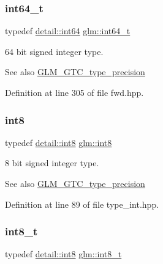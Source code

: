 \subsubsection{\texorpdfstring{int64\+\_\+t}{int64\_t}}
{\footnotesize\ttfamily typedef \hyperlink{namespaceglm_1_1detail_a5b1c3227ec636c24a0676746381adfc8}{detail\+::int64} \hyperlink{group__gtc__type__precision_ga6abb23fbf4e39c50ec5341160b5da5ab}{glm\+::int64\+\_\+t}}

64 bit signed integer type. \begin{DoxySeeAlso}{See also}
\hyperlink{group__gtc__type__precision}{G\+L\+M\+\_\+\+G\+T\+C\+\_\+type\+\_\+precision} 
\end{DoxySeeAlso}


Definition at line 305 of file fwd.\+hpp.

\mbox{\label{group__gtc__type__precision_ga96254f9c1c4506fc8eb5cf3301ce8565}} 
\subsubsection{\texorpdfstring{int8}{int8}}
{\footnotesize\ttfamily typedef \hyperlink{namespaceglm_1_1detail_a04b526a8d7a9b455602a0afa78c531e0}{detail\+::int8} \hyperlink{group__gtc__type__precision_ga96254f9c1c4506fc8eb5cf3301ce8565}{glm\+::int8}}

8 bit signed integer type. \begin{DoxySeeAlso}{See also}
\hyperlink{group__gtc__type__precision}{G\+L\+M\+\_\+\+G\+T\+C\+\_\+type\+\_\+precision} 
\end{DoxySeeAlso}


Definition at line 89 of file type\+\_\+int.\+hpp.

\mbox{\label{group__gtc__type__precision_ga673898d450b2a91186f3c4f40c5f8633}} 
\subsubsection{\texorpdfstring{int8\+\_\+t}{int8\_t}}
{\footnotesize\ttfamily typedef \hyperlink{namespaceglm_1_1detail_a04b526a8d7a9b455602a0afa78c531e0}{detail\+::int8} \hyperlink{group__gtc__type__precision_ga673898d450b2a91186f3c4f40c5f8633}{glm\+::int8\+\_\+t}}

